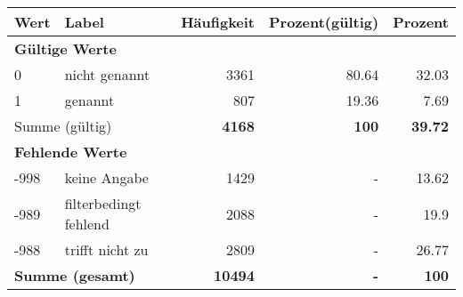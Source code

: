      \begin{longtable}{lXrrr}
     \toprule
     \textbf{Wert} & \textbf{Label} & \textbf{Häufigkeit} & \textbf{Prozent(gültig)} & \textbf{Prozent} \\
     \endhead
     \midrule
     \multicolumn{5}{l}{\textbf{Gültige Werte}}\\

     0 &
     \multicolumn{1}{X}{ nicht genannt   } &


       \num{3361} &
       \num[round-mode=places,round-precision=2]{80.64} &
         \num[round-mode=places,round-precision=2]{32.03} \\

     1 &
     \multicolumn{1}{X}{ genannt   } &


       \num{807} &
       \num[round-mode=places,round-precision=2]{19.36} &
         \num[round-mode=places,round-precision=2]{7.69} \\
     \midrule
     \multicolumn{2}{l}{Summe (gültig)} &
       \textbf{\num{4168}} &
     \textbf{\num{100}} &
       \textbf{\num[round-mode=places,round-precision=2]{39.72}} \\
     \multicolumn{5}{l}{\textbf{Fehlende Werte}}\\
       -998 &
       keine Angabe &
         \num{1429} &
        - &
         \num[round-mode=places,round-precision=2]{13.62} \\
       -989 &
       filterbedingt fehlend &
         \num{2088} &
        - &
         \num[round-mode=places,round-precision=2]{19.9} \\
       -988 &
       trifft nicht zu &
         \num{2809} &
        - &
         \num[round-mode=places,round-precision=2]{26.77} \\
     \midrule
     \multicolumn{2}{l}{\textbf{Summe (gesamt)}} &
          \textbf{\num{10494}} &
        \textbf{-} &
        \textbf{\num{100}} \\
     \bottomrule
     \end{longtable}
     
